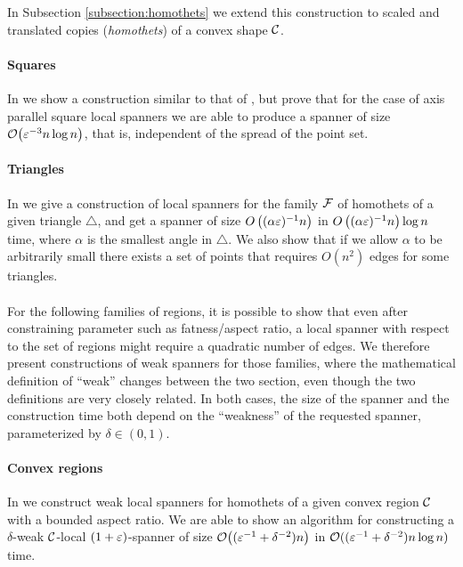 \documentclass[12pt]{article}%
\begin{document}
In Subsection \ref{subsection:homothets} we extend this construction to scaled and translated copies (\emph{homothets}) of a convex shape $\mathcal{C}$.

\paragraph{Squares}
In  we show a construction similar to that of , but prove that for the case of axis parallel square local spanners we are able to produce a spanner of size $\Of\pth{\eps^{-3} n \log n}$, that is, independent of the spread of the point set. 

\paragraph{Triangles}
In  we give a construction of local spanners for the family $\mathcal{F}$ of homothets of a given triangle $\triangle$, and get a spanner of size $O\left((\alpha\varepsilon)^{-1}n\right)$ in $O\left((\alpha\varepsilon)^{-1}n\right)\log n$ time, where $\alpha$ is the smallest angle in $\triangle$. We also show that if we allow $\alpha$ to be arbitrarily small there exists a set of points that requires $O(n^2)$ edges for some triangles.

\paragraph{}
For the following families of regions, it is possible to show that even after constraining parameter such as fatness/aspect ratio, a local spanner with respect to the set of regions might require a quadratic number of edges. We therefore present constructions of weak spanners for those families, where the mathematical definition of ``weak'' changes between the two section, even though the two definitions are very closely related. In both cases, the size of the spanner and the construction time both depend on the ``weakness'' of the requested spanner, parameterized by $\delta\in (0,1)$.

\paragraph{Convex regions}
In  we construct weak local spanners for homothets of a given convex region $\mathcal{C}$ with a bounded aspect ratio. We are able to show an algorithm for constructing a $\delta$-weak $\mathcal{C}$-local $(1+\varepsilon)$-spanner of size $\mathcal{O}\bigl( (\varepsilon^{-1} + \delta^{-2}) n \bigr) $ in $\mathcal{O}( (\varepsilon^{-1} + \delta^{-2}) n \log n)$ time. 
\end{document}
